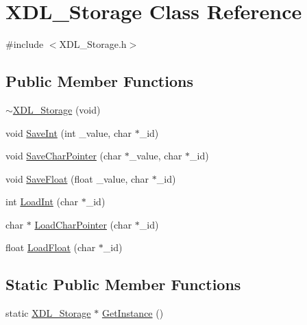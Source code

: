 \hypertarget{class_x_d_l___storage}{\section{X\-D\-L\-\_\-\-Storage Class Reference}
\label{class_x_d_l___storage}
}


{\ttfamily \#include $<$X\-D\-L\-\_\-\-Storage.\-h$>$}

\subsection*{Public Member Functions}
\begin{DoxyCompactItemize}
\item 
\hyperlink{class_x_d_l___storage_af13cd722d2f622b672dc364e95b0cb86}{$\sim$\-X\-D\-L\-\_\-\-Storage} (void)
\item 
void \hyperlink{class_x_d_l___storage_af0cc2938516ff6a2410dd6920888bd7f}{Save\-Int} (int \-\_\-value, char $\ast$\-\_\-id)
\item 
void \hyperlink{class_x_d_l___storage_ad1893c5d3dfbbb0037a1eed6ed1abcbc}{Save\-Char\-Pointer} (char $\ast$\-\_\-value, char $\ast$\-\_\-id)
\item 
void \hyperlink{class_x_d_l___storage_afcd7763d1f4d31b9f05d46d22cfd30b5}{Save\-Float} (float \-\_\-value, char $\ast$\-\_\-id)
\item 
int \hyperlink{class_x_d_l___storage_a21526a669339830f7d40214ca011aa2e}{Load\-Int} (char $\ast$\-\_\-id)
\item 
char $\ast$ \hyperlink{class_x_d_l___storage_a82a1d30c23688ff94441e5976e8d48ff}{Load\-Char\-Pointer} (char $\ast$\-\_\-id)
\item 
float \hyperlink{class_x_d_l___storage_af9d042c604cd818d96220819ea38bfbe}{Load\-Float} (char $\ast$\-\_\-id)
\end{DoxyCompactItemize}
\subsection*{Static Public Member Functions}
\begin{DoxyCompactItemize}
\item 
static \hyperlink{class_x_d_l___storage}{X\-D\-L\-\_\-\-Storage} $\ast$ \hyperlink{class_x_d_l___storage_aacfe0fd0ae64589f641f4139996a0778}{Get\-Instance} ()
\end{DoxyCompactItemize}


